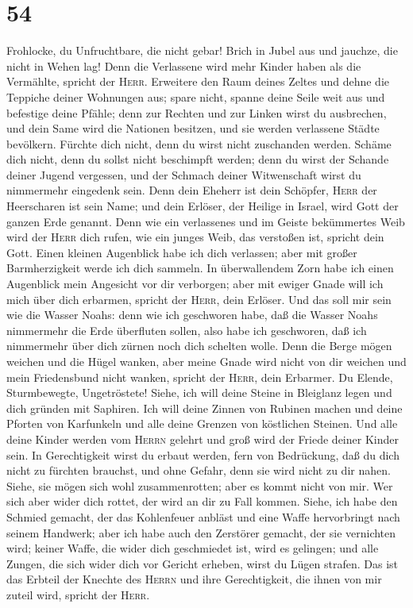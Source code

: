\hypertarget{section-53}{%
\section{54}\label{section-53}}

 Frohlocke, du Unfruchtbare, die nicht gebar! Brich in
Jubel aus und jauchze, die nicht in Wehen lag! Denn die Verlassene wird
mehr Kinder haben als die Vermählte, spricht der \textsc{Herr}.
 Erweitere den Raum deines Zeltes und dehne die Teppiche
deiner Wohnungen aus; spare nicht, spanne deine Seile weit aus und
befestige deine Pfähle;  denn zur Rechten und zur Linken
wirst du ausbrechen, und dein Same wird die Nationen besitzen, und sie
werden verlassene Städte bevölkern.  Fürchte dich nicht,
denn du wirst nicht zuschanden werden. Schäme dich nicht, denn du sollst
nicht beschimpft werden; denn du wirst der Schande deiner Jugend
vergessen, und der Schmach deiner Witwenschaft wirst du nimmermehr
eingedenk sein.  Denn dein Eheherr ist dein Schöpfer,
\textsc{Herr} der Heerscharen ist sein Name; und dein Erlöser, der
Heilige in Israel, wird Gott der ganzen Erde genannt. 
Denn wie ein verlassenes und im Geiste bekümmertes Weib wird der
\textsc{Herr} dich rufen, wie ein junges Weib, das verstoßen ist,
spricht dein Gott.  Einen kleinen Augenblick habe ich dich
verlassen; aber mit großer Barmherzigkeit werde ich dich sammeln.
 In überwallendem Zorn habe ich einen Augenblick mein
Angesicht vor dir verborgen; aber mit ewiger Gnade will ich mich über
dich erbarmen, spricht der \textsc{Herr}, dein Erlöser. 
Und das soll mir sein wie die Wasser Noahs: denn wie ich geschworen
habe, daß die Wasser Noahs nimmermehr die Erde überfluten sollen, also
habe ich geschworen, daß ich nimmermehr über dich zürnen noch dich
schelten wolle.  Denn die Berge mögen weichen und die
Hügel wanken, aber meine Gnade wird nicht von dir weichen und mein
Friedensbund nicht wanken, spricht der \textsc{Herr}, dein Erbarmer.
 Du Elende, Sturmbewegte, Ungetröstete! Siehe, ich will
deine Steine in Bleiglanz legen und dich gründen mit Saphiren.
 Ich will deine Zinnen von Rubinen machen und deine
Pforten von Karfunkeln und alle deine Grenzen von köstlichen Steinen.
 Und alle deine Kinder werden vom \textsc{Herrn} gelehrt
und groß wird der Friede deiner Kinder sein.  In
Gerechtigkeit wirst du erbaut werden, fern von Bedrückung, daß du dich
nicht zu fürchten brauchst, und ohne Gefahr, denn sie wird nicht zu dir
nahen.  Siehe, sie mögen sich wohl zusammenrotten; aber
es kommt nicht von mir. Wer sich aber wider dich rottet, der wird an dir
zu Fall kommen.  Siehe, ich habe den Schmied gemacht, der
das Kohlenfeuer anbläst und eine Waffe hervorbringt nach seinem
Handwerk; aber ich habe auch den Zerstörer gemacht, der sie vernichten
wird;  keiner Waffe, die wider dich geschmiedet ist, wird
es gelingen; und alle Zungen, die sich wider dich vor Gericht erheben,
wirst du Lügen strafen. Das ist das Erbteil der Knechte des
\textsc{Herrn} und ihre Gerechtigkeit, die ihnen von mir zuteil wird,
spricht der \textsc{Herr}.

